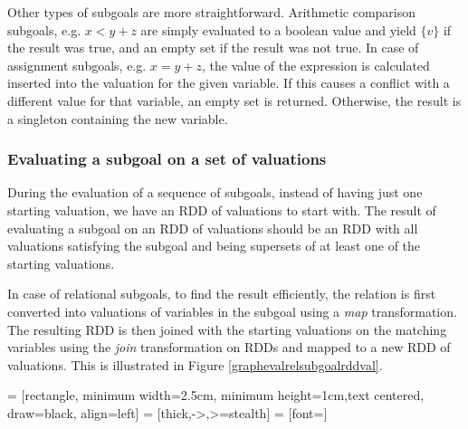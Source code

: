Other types of subgoals are more straightforward. Arithmetic comparison subgoals, e.g. $x < y + z$ are simply evaluated to a boolean value and yield $\{v\}$ if the result was true, and an empty set if the result was not true. In case of assignment subgoals, e.g. $x = y + z$, the value of the expression is calculated inserted into the valuation for the given variable. If this causes a conflict with a different value for that variable, an empty set is returned. Otherwise, the result is a singleton containing the new variable.

\subsubsection{Evaluating a subgoal on a set of valuations}
During the evaluation of a sequence of subgoals, instead of having just one starting valuation, we have an RDD of valuations to start with. The result of evaluating a subgoal on an RDD of valuations should be an RDD with all valuations satisfying the subgoal and being supersets of at least one of the starting valuations.

In case of relational subgoals, to find the result efficiently, the relation is first converted into valuations of variables in the subgoal using a \emph{map} transformation. The resulting RDD is then joined with the starting valuations on the matching variables using the \emph{join} transformation on RDDs and mapped to a new RDD of valuations. This is illustrated in Figure \ref{graphevalrelsubgoalrddval}.

 = [rectangle, minimum width=2.5cm, minimum height=1cm,text centered, draw=black, align=left]
 = [thick,->,>=stealth]
 = [font=\scriptsize]

